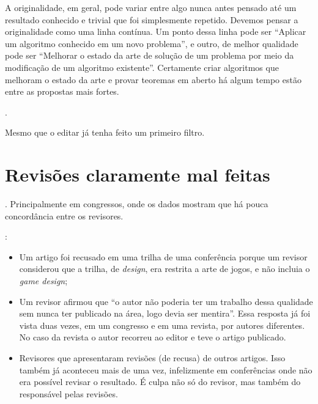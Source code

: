 \documentclass[openany]{book}
\begin{document}
 A originalidade, em geral, pode variar entre algo nunca antes pensado até um resultado conhecido e trivial que foi simplesmente repetido. Devemos pensar a originalidade como uma linha contínua. Um ponto dessa linha pode ser ``Aplicar um algoritmo conhecido em um novo problema'', e outro, de melhor qualidade pode ser ``Melhorar o estado da arte de solução de um problema por meio da modificação de um algoritmo existente''. Certamente criar algoritmos que melhoram o estado da arte e provar teoremas em aberto há algum tempo estão entre as propostas mais fortes.

.


 Mesmo que o editar já tenha feito um primeiro filtro.

\section{Revisões claramente mal feitas}


. Principalmente em congressos, onde os dados mostram que há pouca concordância entre os revisores\favorcitar.

:
\begin{itemize}
    \item Um artigo foi recusado em uma trilha de uma conferência porque um revisor considerou que a trilha, de \textit{design}, era restrita a arte de jogos, e não incluia o \textit{game design};
    \item Um revisor afirmou que ``o autor não poderia ter um trabalho dessa qualidade sem nunca ter publicado na área, logo devia ser mentira''.  Essa resposta já foi vista duas vezes, em um congresso e em uma revista, por autores diferentes. No caso da revista o autor recorreu ao editor e teve o artigo publicado.
    \item Revisores que apresentaram revisões (de recusa) de outros artigos. Isso também já aconteceu mais de uma vez, infelizmente em conferências onde não era possível revisar o resultado. É culpa não só do revisor, mas também do responsável pelas revisões.
\end{itemize}
\end{document}
